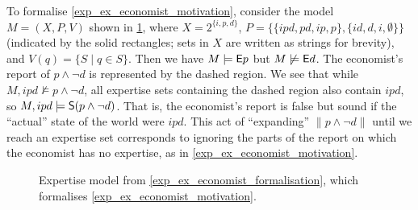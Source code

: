 \begin{example}
    \label{exp_ex_economist_formalisation}

    To formalise \cref{exp_ex_economist_motivation}, consider the model $M = (X, P,
    V)$ shown in \cref{exp_fig_economist_example}, where $X =
    2^{\{i,p,d\}}$, $P = \{\{ipd,pd,ip,p\},
    \{id,d,i,\emptyset\}\}$ (indicated by the solid rectangles; sets in $X$ are
    written as strings for brevity), and $V(q) =
    \{S \mid q \in S\}$. Then we have $M \models \E p$ but $M \not\models \E
    d$. The economist's report of $p \land \neg d$ is represented by the dashed
    region. We see that while $M, ipd \not\models p \land \neg d$, all
    expertise sets containing the dashed region also contain $ipd$, so $M, ipd
    \models \S(p \land \neg d)$. That is, the economist's report is false but
    sound if the ``actual'' state of the world were $ipd$. This act of
    ``expanding'' $\|p \land \neg d\|$ until we reach an expertise set
    corresponds to ignoring the parts of the report on which the economist has
    no expertise, as in \cref{exp_ex_economist_motivation}.

\end{example}

\begin{figure}
    \centering
    \caption{
        Expertise model from \cref{exp_ex_economist_formalisation}, which
        formalises \cref{exp_ex_economist_motivation}.
    }
    \label{exp_fig_economist_example}
\end{figure}

